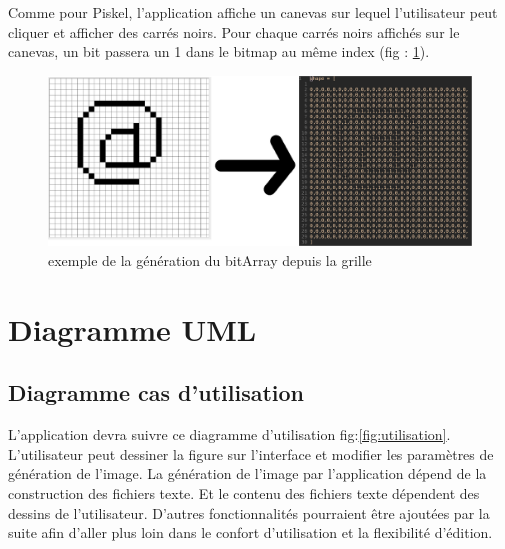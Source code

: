 \documentclass{article}
\begin{document}
Comme pour Piskel, l'application affiche un canevas sur lequel l'utilisateur peut cliquer et afficher des carrés noirs. Pour chaque carrés noirs affichés sur le canevas, un bit passera un 1 dans le bitmap au même index (fig : \ref{fig:canevas_array}). 

\begin{figure}[!h]
	\centering
	\includegraphics[scale=0.8]{./images/grid-txt.png}
	\caption{exemple de la génération du bitArray depuis la grille}
	\label{fig:canevas_array}
\end{figure}

\newpage
\section{Diagramme UML}
\subsection{Diagramme cas d'utilisation}

L'application devra suivre ce diagramme d'utilisation fig:\ref{fig:utilisation}. L'utilisateur peut dessiner la figure sur l'interface et modifier les paramètres de génération de l'image. La génération de l'image par l'application dépend de la construction des fichiers texte. Et le contenu des fichiers texte dépendent des dessins de l'utilisateur. D'autres fonctionnalités pourraient être ajoutées par la suite afin d'aller plus loin dans le confort d'utilisation et la flexibilité d'édition. 
\end{document}
